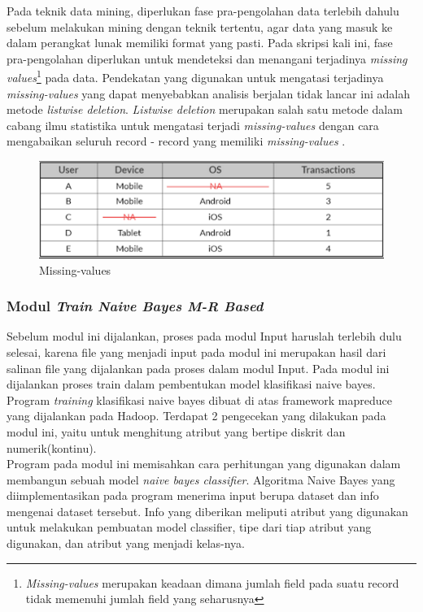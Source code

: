 Pada teknik data mining, diperlukan fase pra-pengolahan data terlebih dahulu sebelum melakukan mining dengan teknik tertentu, agar data yang masuk ke dalam perangkat lunak memiliki format yang pasti. Pada skripsi kali ini, fase pra-pengolahan diperlukan untuk mendeteksi dan menangani terjadinya \textit{missing values}\footnote{\textit{Missing-values} merupakan keadaan dimana jumlah field pada suatu record tidak memenuhi jumlah field yang seharusnya} pada data. Pendekatan yang digunakan untuk mengatasi terjadinya \textit{missing-values} yang dapat menyebabkan analisis berjalan tidak lancar ini adalah metode \textit{listwise deletion}. \textit{Listwise deletion} merupakan salah satu metode dalam cabang ilmu statistika untuk mengatasi terjadi \textit{missing-values} dengan cara mengabaikan seluruh record - record yang memiliki \textit{missing-values} \cite{PeughMissing:2004}.

\begin{figure}[ht]
	\centering
	\includegraphics[scale=0.5]{GambarIO/Missing-values}
	\caption[Missing-values]{Missing-values \cite{MissingVal:2016}} 
	\label{fig:Missing-values}
\end{figure}

\subsubsection{Modul \textit{Train Naive Bayes M-R Based}}
\label{subsubsec:Modul Train Naive Bayes M-R Based}

Sebelum modul ini dijalankan, proses pada modul Input haruslah terlebih dulu selesai, karena file yang menjadi input pada modul ini merupakan hasil dari salinan file yang dijalankan pada proses dalam modul Input. Pada modul ini dijalankan proses train dalam pembentukan model klasifikasi naive bayes. Program \textit{training} klasifikasi naive bayes dibuat di atas framework mapreduce yang dijalankan pada Hadoop. Terdapat 2 pengecekan yang dilakukan pada modul ini, yaitu untuk menghitung atribut yang bertipe diskrit dan numerik(kontinu).\\
	Program pada modul ini memisahkan cara perhitungan yang digunakan dalam membangun sebuah model \textit{naive bayes classifier}. Algoritma Naive Bayes yang diimplementasikan pada program menerima input berupa dataset dan info mengenai dataset tersebut. Info yang diberikan meliputi atribut yang digunakan untuk melakukan pembuatan model classifier, tipe dari tiap atribut yang digunakan, dan atribut yang menjadi kelas-nya.
	

